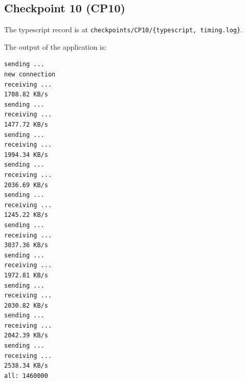 \documentclass[a4paper]{article}
\begin{document}
  \subsection{Checkpoint 10 (CP10)}

  The typescript record is at \texttt{checkpoints/CP10/\{typescript, timing.log\}}.

  The output of the application is:
  \begin{verbatim}
sending ...
new connection
receiving ...
1708.82 KB/s
sending ...
receiving ...
1477.72 KB/s
sending ...
receiving ...
1994.34 KB/s
sending ...
receiving ...
2036.69 KB/s
sending ...
receiving ...
1245.22 KB/s
sending ...
receiving ...
3037.36 KB/s
sending ...
receiving ...
1972.81 KB/s
sending ...
receiving ...
2030.82 KB/s
sending ...
receiving ...
2042.39 KB/s
sending ...
receiving ...
2538.34 KB/s
all: 1460000
  \end{verbatim}
\end{document}
